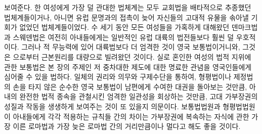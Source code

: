 보여준다.
한 여성에게 가장 덜 관대한 법체계는 모두
교회법을 배타적으로 추종했던 법체계들이거나,
아니면
유럽 문명과의 접촉이 늦어 자신들의 고대적 유물을 솎아낼 기회가 없었던
법체계들이었다.
수 세기 동안 모든 여성들을 가혹하게 대해왔던 덴마크법과 스웨덴법은
여전히 아내들에게는
일반적인 유럽 대륙의 법전들보다
훨씬 덜 우호적이다.
그러나 적 무능력에 있어 대륙법보다 더 엄격한 것이
영국 보통법이거니와,
그것은 으로부터 근본원리를 대량으로 빌려왔던 것이다.
실로 혼인한 여성의 법적 지위에 관한 보통법은
본 장의 주제인 저 중차대한 제도에 대한 명료한 관념을
영국인들에게 심어줄 수 있을 법하다.
일체의 권리와 의무와 구제수단을 통하여,
형평법이나 제정법의 손을 타지 않은
순수한 영국 보통법이
남편에게 수여한 대권을 돌아보는 것만큼,
아내의 완전한 법적 종속을 관철시킨 엄격한 일관성을 회상하는 것만큼,
고대 가부장권의 성질과 작동을 생생하게 보여주는 것이 또 있을지 의문이다.
보통법법원과 형평법법원이 아내들에게 각각 적용하는 규칙들 간의 차이는
가부장권에 복속하는 자식에 관한 가장 이른 로마법과 가장 늦은 로마법 간의
거리만큼이나 멀다고 해도 좋을 것이다.


